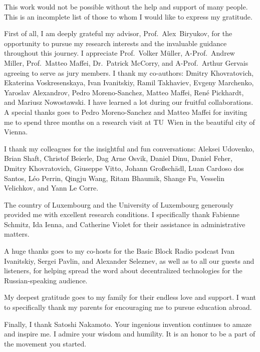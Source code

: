 \begin{abstract}
\end{abstract}


\begin{acknowledgements}
\addchaptertocentry{\acknowledgementname} %
This work would not be possible without the help and support of many people.
This is an incomplete list of those to whom I would like to express my gratitude.

First of all, I am deeply grateful my advisor, Prof.~Alex~Biryukov, for the opportunity to pursue my research interests and the invaluable guidance throughout this journey.
I appreciate Prof.~Volker M{\"u}ller, A-Prof.~Andrew Miller, Prof.~Matteo Maffei, Dr.~Patrick McCorry, and A-Prof.~Arthur Gervais agreeing to serve as jury members.
I thank my co-authors: Dmitry Khovratovich, Ekaterina Voskresenskaya, Ivan Ivanitskiy, Ramil Takhaviev, Evgeny Marchenko, Yaroslav Alexandrov, Pedro Moreno-Sanchez, Matteo Maffei, Ren{\'e} Pickhardt, and Mariusz Nowostawski.
I have learned a lot during our fruitful collaborations.
A special thanks goes to Pedro Moreno-Sanchez and Matteo Maffei for inviting me to spend three months on a research visit at TU~Wien in the beautiful city of Vienna.

I thank my colleagues for the insightful and fun conversations: Aleksei Udovenko, Brian Shaft, Christof Beierle, Dag Arne Osvik, Daniel Dinu, Daniel Feher, Dmitry Khovratovich, Giuseppe Vitto, Johann Gro{\ss}sch{\"a}dl, Luan Cardoso dos Santos, L{\'e}o Perrin, Qingju Wang, Ritam Bhaumik, Shange Fu, Vesselin Velichkov, and Yann Le Corre.

The country of Luxembourg and the University of Luxembourg generously provided me with excellent research conditions.
I specifically thank Fabienne Schmitz, Ida Ienna, and Catherine Violet for their assistance in administrative matters.

A huge thanks goes to my co-hosts for the Basic Block Radio podcast Ivan Ivanitskiy, Sergei Pavlin, and Alexander Seleznev, as well as to all our guests and listeners, for helping spread the word about decentralized technologies for the Russian-speaking audience.

My deepest gratitude goes to my family for their endless love and support.
I want to specifically thank my parents for encouraging me to pursue education abroad.

Finally, I thank Satoshi Nakamoto.
Your ingenious invention continues to amaze and inspire me.
I admire your wisdom and humility.
It is an honor to be a part of the movement you started.

\end{acknowledgements}

